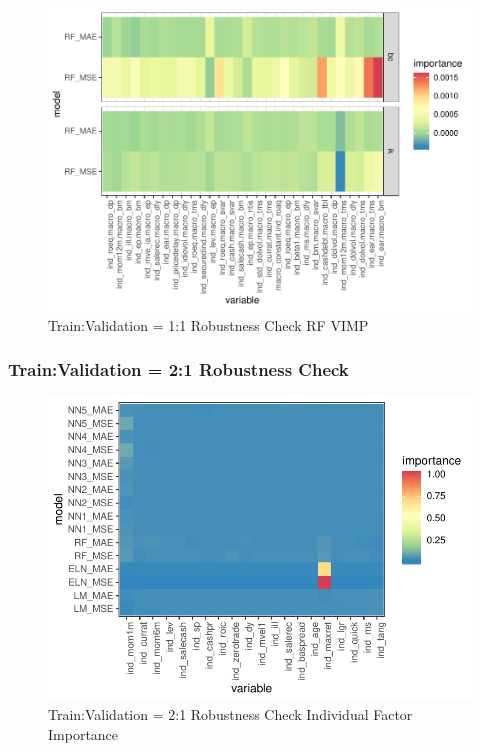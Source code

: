 \documentclass[11pt, a4paper, table]{article}
\begin{document}

\begin{figure}
	\includegraphics[]{../Results/empirical_train_valid_1/empirical_vimp.pdf}
	\caption{{Train:Validation = 1:1 Robustness Check RF VIMP}}
\end{figure}

\FloatBarrier
\subsubsection{Train:Validation = 2:1 Robustness Check}





\FloatBarrier


\begin{figure}
	\includegraphics[]{../Results/empirical_train_valid_2/empirical_all_sample_vi_ind.pdf}
	\caption{Train:Validation = 2:1 Robustness Check Individual Factor Importance}
\end{figure}
\end{document}
